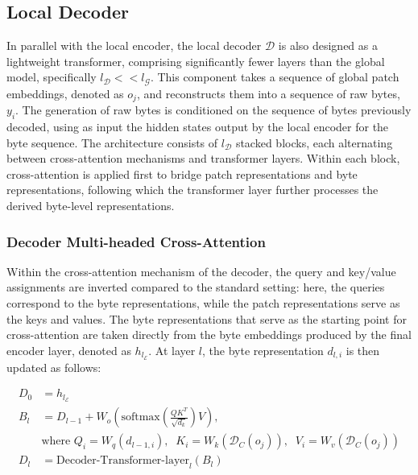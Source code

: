 \subsection{Local Decoder} 

In parallel with the local encoder, the local decoder $\mathcal{D}$ is also designed as a lightweight transformer, comprising significantly fewer layers than the global model, specifically $l_{\mathcal{D}} << l_{\mathcal{G}}$. This component takes a sequence of global patch embeddings, denoted as $o_j$, and reconstructs them into a sequence of raw bytes, $y_i$. The generation of raw bytes is conditioned on the sequence of bytes previously decoded, using as input the hidden states output by the local encoder for the byte sequence. The architecture consists of $l_{\mathcal{D}}$ stacked blocks, each alternating between cross-attention mechanisms and transformer layers. Within each block, cross-attention is applied first to bridge patch representations and byte representations, following which the transformer layer further processes the derived byte-level representations.

\subsubsection{Decoder Multi-headed Cross-Attention} 

Within the cross-attention mechanism of the decoder, the query and key/value assignments are inverted compared to the standard setting: here, the queries correspond to the byte representations, while the patch representations serve as the keys and values. The byte representations that serve as the starting point for cross-attention are taken directly from the byte embeddings produced by the final encoder layer, denoted as $h_{l_{\mathcal{E}}}$. At layer $l$, the byte representation $d_{l,i}$ is then updated as follows:

\begin{align}
D_0 &= h_{l_{\mathcal{E}}} \\
B_l &= D_{l-1} + W_o\left(\text{softmax}\left(\frac{QK^T}{\sqrt{d_k}}\right)V\right), \\
  &\text{where } Q_i = W_q(d_{l-1,i}),\;\; K_i = W_k(\mathcal{D}_C(o_j)),\;\; V_i = W_v(\mathcal{D}_C(o_j)) \\
  D_l &= \text{Decoder-Transformer-layer}_l(B_l)
\end{align}

